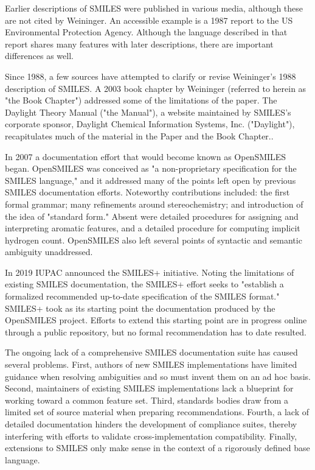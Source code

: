 \documentclass{article}
\begin{document}
Earlier descriptions of SMILES were published in various media, although these are not cited by Weininger. An accessible example is a 1987 report to the US Environmental Protection Agency.\cite{anderson1987} Although the language described in that report shares many features with later descriptions, there are important differences as well.

Since 1988, a few sources have attempted to clarify or revise Weininger's 1988 description of SMILES. A 2003 book chapter by Weininger (referred to herein as "the Book Chapter") addressed some of the limitations of the paper. The Daylight Theory Manual ("the Manual"), a website maintained by SMILES's corporate sponsor, Daylight Chemical Information Systems, Inc. ("Daylight"), recapitulates much of the material in the Paper and the Book Chapter.\cite{daylightTheory}.

In 2007 a documentation effort that would become known as OpenSMILES began.\cite{openSMILES} OpenSMILES was conceived as "a non-proprietary specification for the SMILES language," and it addressed many of the points left open by previous SMILES documentation efforts. Noteworthy contributions included: the first formal grammar; many refinements around stereochemistry; and introduction of the idea of "standard form." Absent were detailed procedures for assigning and interpreting aromatic features, and a detailed procedure for computing implicit hydrogen count. OpenSMILES also left several points of syntactic and semantic ambiguity unaddressed.

In 2019 IUPAC announced the SMILES+ initiative.\cite{smilesPlus} Noting the limitations of existing SMILES documentation, the SMILES+ effort seeks to "establish a formalized recommended up-to-date specification of the SMILES format." SMILES+ took as its starting point the documentation produced by the OpenSMILES project. Efforts to extend this starting point are in progress online through a public repository, but no formal recommendation has to date resulted.\cite{smilesPlusRepo}

The ongoing lack of a comprehensive SMILES documentation suite has caused several problems. First, authors of new SMILES implementations have limited guidance when resolving ambiguities and so must invent them on an ad hoc basis. Second, maintainers of existing SMILES implementations lack a blueprint for working toward a common feature set. Third, standards bodies draw from a limited set of source material when preparing recommendations. Fourth, a lack of detailed documentation hinders the development of compliance suites, thereby interfering with efforts to validate cross-implementation compatibility. Finally, extensions to SMILES only make sense in the context of a rigorously defined base language.
\end{document}
